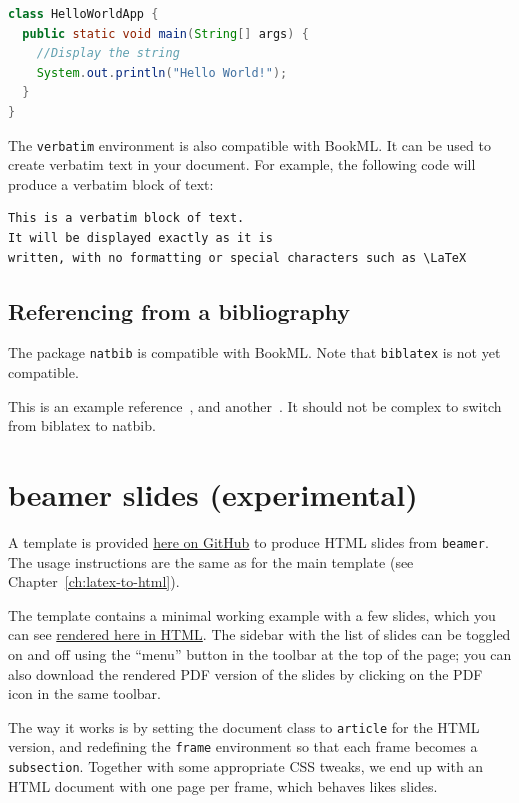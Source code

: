 \begin{lstlisting}[language=Java]
class HelloWorldApp {
  public static void main(String[] args) {
    //Display the string
    System.out.println("Hello World!");
  }
}
\end{lstlisting}
The \texttt{verbatim} environment is also compatible with BookML. It can be used to create verbatim text in your document. For example, the following code will produce a verbatim block of text:

\begin{verbatim}
This is a verbatim block of text.
It will be displayed exactly as it is 
written, with no formatting or special characters such as \LaTeX
\end{verbatim}

\subsection{Referencing from a bibliography}
\label{bib}

The package \texttt{natbib} is compatible with BookML. Note that \texttt{biblatex} is not yet compatible.

This is an example reference~\cite{strikwerda2004}, and another~\citep{parret2016time}. It should not be complex to switch from biblatex to natbib. 


\section{beamer slides (experimental)}
\label{demo:slides}

A template is provided \href{https://github.com/UoE-School-of-Mathematics/Workflow-Template-Slides}{here on GitHub} to produce HTML slides from \texttt{beamer}. The usage instructions are the same as for the main template (see Chapter~\ref{ch:latex-to-html}).

The template contains a minimal working example with a few slides, which you can see \href{https://uoe-school-of-mathematics.github.io/Workflow-Template-Slides/}{rendered here in HTML}. The sidebar with the list of slides can be toggled on and off using the ``menu'' button in the toolbar at the top of the page; you can also download the rendered PDF version of the slides by clicking on the PDF icon in the same toolbar.

The way it works is by setting the document class to \texttt{article} for the HTML version, and redefining the \texttt{frame} environment so that each frame becomes a \verb|subsection|. Together with some appropriate CSS tweaks, we end up with an HTML document with one page per frame, which behaves likes slides.

